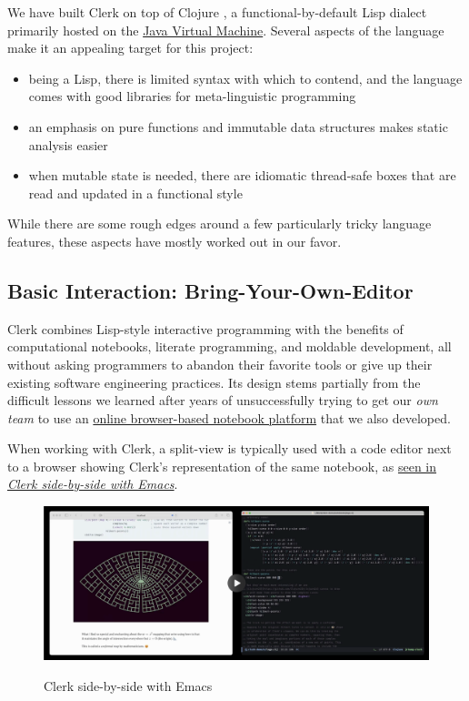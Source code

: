 \documentclass[sigconf,screen]{acmart}
\providecommand{\tightlist}{%
  \setlength{\itemsep}{0pt}\setlength{\parskip}{0pt}}
\begin{document}
We have built Clerk on top of Clojure \cite{Hickey_2020}, a functional-by-default Lisp dialect primarily hosted on the \href{https://en.wikipedia.org/wiki/Java_virtual_machine}{Java Virtual Machine}. Several aspects of the language make it an appealing target for this project:

\begin{itemize}
\tightlist
\item
  being a Lisp, there is limited syntax with which to contend, and the language comes with good libraries for meta-linguistic programming
\item
  an emphasis on pure functions and immutable data structures makes static analysis easier
\item
  when mutable state is needed, there are idiomatic thread-safe boxes that are read and updated in a functional style
\end{itemize}

While there are some rough edges around a few particularly tricky language features, these aspects have mostly worked out in our favor.

\hypertarget{basic-interaction:-bring-your-own-editor}{%
\subsection{Basic Interaction: Bring-Your-Own-Editor}\label{basic-interaction:-bring-your-own-editor}}

Clerk combines Lisp-style interactive programming with the benefits of computational notebooks, literate programming, and moldable development, all without asking programmers to abandon their favorite tools or give up their existing software engineering practices. Its design stems partially from the difficult lessons we learned after years of unsuccessfully trying to get our \emph{own team} to use an \href{https://nextjournal.com}{online browser-based notebook platform} that we also developed.

When working with Clerk, a split-view is typically used with a code editor next to a browser showing Clerk's representation of the same notebook, as \protect\hyperlink{clerk-side-by-side-with-emacs}{seen in \emph{Clerk side-by-side with Emacs}}.

\begin{figure}
\hypertarget{clerk-side-by-side-with-emacs}{%
\centering
\href{https://cdn.nextjournal.com/data/QmVYLx5SByNZi9hFnK2zx1K6Bz8FZqQ7wYtAwzYCxEhvfh?content-type=video/mp4}{\includegraphics{images/clerk-side-by-side-with-emacs.png}}
\caption{Clerk side-by-side with Emacs}\label{clerk-side-by-side-with-emacs}
}
\end{figure}
\end{document}
